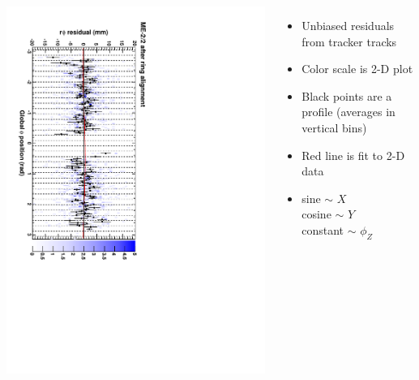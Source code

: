 \documentclass[compress]{beamer}
\begin{document}
\begin{frame}
\begin{columns}
\includegraphics[height=\linewidth, angle=90]{ringfits_after/mem22.pdf}
\begin{itemize}
\item Unbiased residuals from tracker tracks
\item Color scale is 2-D plot
\item Black points are a profile (averages in vertical bins)
\item Red line is fit to 2-D data
\item sine $\sim$ $X$ \\
cosine $\sim$ $Y$ \\
constant $\sim$ $\phi_Z$
\end{itemize}
\end{columns}
\end{frame}
\end{document}
